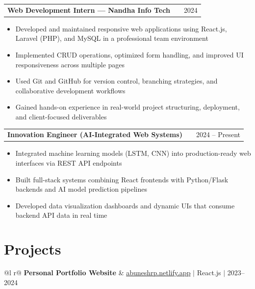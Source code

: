\documentclass[a4paper,12pt]{article}
\makeatletter
\newenvironment{joblong}[2]
    {
    \begin{tabularx}{\linewidth}{@{}l X r@{}}
    \textbf{#1} & \hfill & #2 \\[2pt]
    \end{tabularx}
    \begin{minipage}[t]{\linewidth}
    \begin{itemize}[nosep,after=\strut, leftmargin=1em, itemsep=2pt,label=--]
    }
    {
    \end{itemize}
    \end{minipage}
    }
\makeatother
\begin{document}
\begin{joblong}{Web Development Intern --- Nandha Info Tech}{2024}
\item Developed and maintained responsive web applications using React.js, Laravel (PHP), and MySQL in a professional team environment
\item Implemented CRUD operations, optimized form handling, and improved UI responsiveness across multiple pages
\item Used Git and GitHub for version control, branching strategies, and collaborative development workflows
\item Gained hands-on experience in real-world project structuring, deployment, and client-focused deliverables
\end{joblong}

\begin{joblong}{Innovation Engineer (AI-Integrated Web Systems)}{2024 -- Present}
\item Integrated machine learning models (LSTM, CNN) into production-ready web interfaces via REST API endpoints
\item Built full-stack systems combining React frontends with Python/Flask backends and AI model prediction pipelines
\item Developed data visualization dashboards and dynamic UIs that consume backend API data in real time
\end{joblong}

\section{Projects}

\begin{tabularx}{\linewidth}{ @{}l r@{} }
\textbf{Personal Portfolio Website} & \hfill \href{https://abuneshrp.netlify.app}{abuneshrp.netlify.app} $|$ React.js $|$ 2023--2024 \\[2pt]
 \\
\end{tabularx}

\vspace{4pt}
\end{document}
